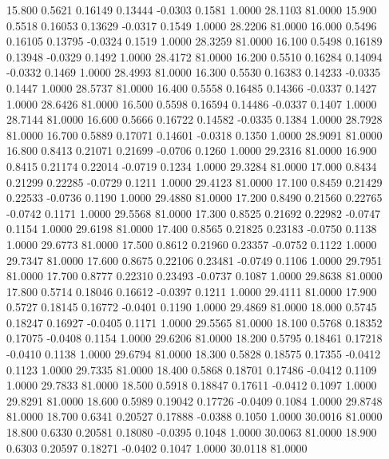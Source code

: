   15.800   0.5621   0.16149   0.13444  -0.0303   0.1581   1.0000  28.1103  81.0000
  15.900   0.5518   0.16053   0.13629  -0.0317   0.1549   1.0000  28.2206  81.0000
  16.000   0.5496   0.16105   0.13795  -0.0324   0.1519   1.0000  28.3259  81.0000
  16.100   0.5498   0.16189   0.13948  -0.0329   0.1492   1.0000  28.4172  81.0000
  16.200   0.5510   0.16284   0.14094  -0.0332   0.1469   1.0000  28.4993  81.0000
  16.300   0.5530   0.16383   0.14233  -0.0335   0.1447   1.0000  28.5737  81.0000
  16.400   0.5558   0.16485   0.14366  -0.0337   0.1427   1.0000  28.6426  81.0000
  16.500   0.5598   0.16594   0.14486  -0.0337   0.1407   1.0000  28.7144  81.0000
  16.600   0.5666   0.16722   0.14582  -0.0335   0.1384   1.0000  28.7928  81.0000
  16.700   0.5889   0.17071   0.14601  -0.0318   0.1350   1.0000  28.9091  81.0000
  16.800   0.8413   0.21071   0.21699  -0.0706   0.1260   1.0000  29.2316  81.0000
  16.900   0.8415   0.21174   0.22014  -0.0719   0.1234   1.0000  29.3284  81.0000
  17.000   0.8434   0.21299   0.22285  -0.0729   0.1211   1.0000  29.4123  81.0000
  17.100   0.8459   0.21429   0.22533  -0.0736   0.1190   1.0000  29.4880  81.0000
  17.200   0.8490   0.21560   0.22765  -0.0742   0.1171   1.0000  29.5568  81.0000
  17.300   0.8525   0.21692   0.22982  -0.0747   0.1154   1.0000  29.6198  81.0000
  17.400   0.8565   0.21825   0.23183  -0.0750   0.1138   1.0000  29.6773  81.0000
  17.500   0.8612   0.21960   0.23357  -0.0752   0.1122   1.0000  29.7347  81.0000
  17.600   0.8675   0.22106   0.23481  -0.0749   0.1106   1.0000  29.7951  81.0000
  17.700   0.8777   0.22310   0.23493  -0.0737   0.1087   1.0000  29.8638  81.0000
  17.800   0.5714   0.18046   0.16612  -0.0397   0.1211   1.0000  29.4111  81.0000
  17.900   0.5727   0.18145   0.16772  -0.0401   0.1190   1.0000  29.4869  81.0000
  18.000   0.5745   0.18247   0.16927  -0.0405   0.1171   1.0000  29.5565  81.0000
  18.100   0.5768   0.18352   0.17075  -0.0408   0.1154   1.0000  29.6206  81.0000
  18.200   0.5795   0.18461   0.17218  -0.0410   0.1138   1.0000  29.6794  81.0000
  18.300   0.5828   0.18575   0.17355  -0.0412   0.1123   1.0000  29.7335  81.0000
  18.400   0.5868   0.18701   0.17486  -0.0412   0.1109   1.0000  29.7833  81.0000
  18.500   0.5918   0.18847   0.17611  -0.0412   0.1097   1.0000  29.8291  81.0000
  18.600   0.5989   0.19042   0.17726  -0.0409   0.1084   1.0000  29.8748  81.0000
  18.700   0.6341   0.20527   0.17888  -0.0388   0.1050   1.0000  30.0016  81.0000
  18.800   0.6330   0.20581   0.18080  -0.0395   0.1048   1.0000  30.0063  81.0000
  18.900   0.6303   0.20597   0.18271  -0.0402   0.1047   1.0000  30.0118  81.0000

